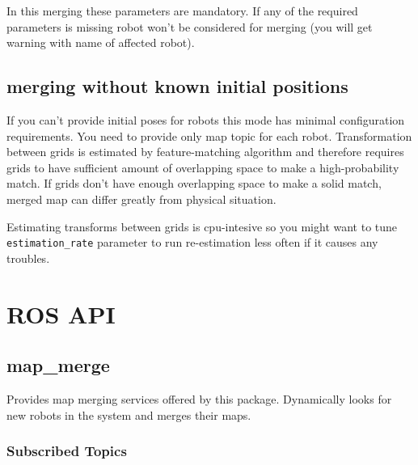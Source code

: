In this merging these parameters are mandatory. If any of the required parameters is missing robot won't be considered for merging (you will get warning with name of affected robot).

\subsection{merging without known initial positions}

If you can't provide initial poses for robots this mode has minimal configuration requirements. You need to provide only map topic for each robot. Transformation between grids is estimated by feature-matching algorithm and therefore requires grids to have sufficient amount of overlapping space to make a high-probability match. If grids don't have enough overlapping space to make a solid match, merged map can differ greatly from physical situation.

Estimating transforms between grids is cpu-intesive so you might want to tune \texttt{estimation\_rate} parameter to run re-estimation less often if it causes any troubles.

\section{ROS API}
\label{sec:rosapi}

\subsection{map\_merge}

Provides map merging services offered by this package. Dynamically looks for new robots in the system and merges their maps.

\subsubsection{Subscribed Topics}


